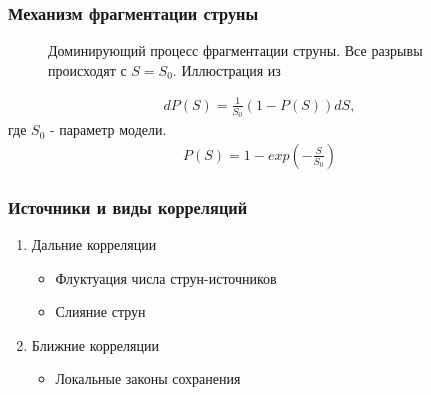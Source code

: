 \documentclass{beamer}
\renewcommand{\l}{\left( }
\renewcommand{\r}{\right) }
\newcommand{\br}[1]{\l {#1} \r}
\newcommand{\abs}[1]{\left| #1 \right|}
\begin{document}
\begin{frame}[fragile]
\frametitle{Механизм фрагментации струны}
\begin{minipage}[h]{0.48\linewidth}
\begin{figure}
\caption{Доминирующий процесс фрагментации струны. 
Все разрывы происходят с $S = S_0$. 
Иллюстрация из \cite{fragmentation_lit}}
\label{fragmentation}
\end{figure}
\end{minipage}
\hfill
\begin{minipage}[h]{0.48\linewidth}
\begin{gather}
dP \br{S} = \frac{1}{S_0} \br{1 - P \br{S}} dS, \nonumber
\end{gather}
где $S_0$ - параметр модели.
\begin{gather}
P \br{S} = 1 - exp \br{-\frac{S}{S_0}} \nonumber
\end{gather}
$$$$
\center{\fbox{$\abs{\Delta \eta} \approx 1$}}
\end{minipage}
\end{frame}

\begin{frame}[fragile]
\frametitle{Источники и виды корреляций}
\begin{enumerate}
\item Дальние корреляции
    \begin{itemize}
    \item Флуктуация числа струн-источников
    \item Слияние струн 
    \end{itemize}
\item Ближние корреляции
    \begin{itemize}
    \item Локальные законы сохранения
    \end{itemize}
\end{enumerate}
\end{frame}
\end{document}
